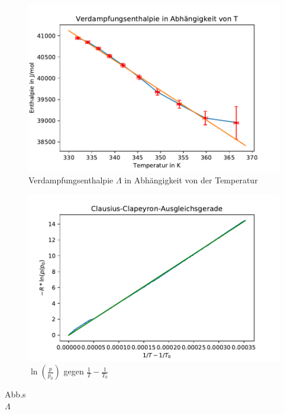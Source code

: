 \documentclass[]{article}
\begin{document}
\begin{figure}
	\begin{center}
		\includegraphics[scale=0.9]{Images/Dampfdruck_L.pdf}
		\caption{Verdampfungsenthalpie $\Lambda$ in Abhängigkeit von der Temperatur}
		\label{DD_L(T)}
	\end{center}
\end{figure}

\begin{figure}
	\begin{center}
		\includegraphics[scale=0.9]{Images/Dampfdruck_ln.pdf}
		\caption{$\ln(\frac{p}{p_0})$ gegen $\frac{1}{T} - \frac{1}{T_0}$}
		\label{DD_ln-1}
	\end{center}
\end{figure}

Abb.s\\
$\Lambda$\\ 
\end{document}
